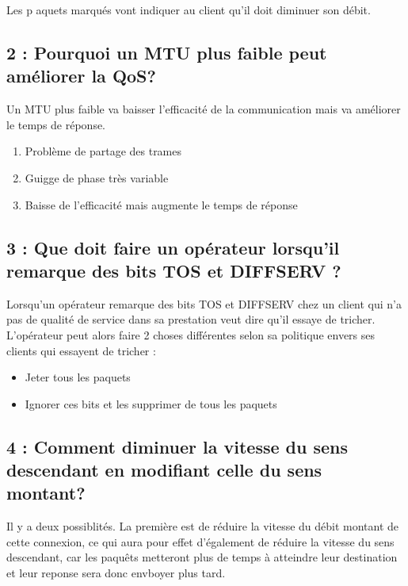\documentclass{article}
\begin{document}
Les p	aquets marqués vont indiquer au client qu'il doit diminuer son débit.

\subsection*{2 : Pourquoi un MTU plus faible peut améliorer la QoS?}

Un MTU plus faible va baisser l'efficacité de la communication mais va améliorer le temps de réponse.
\begin{enumerate}
\item Problème de partage des trames
\item Guigge de phase très variable
\item Baisse de l'efficacité mais augmente le temps de réponse
\end{enumerate}

\subsection*{3 : Que doit faire un opérateur lorsqu'il remarque des bits TOS et DIFFSERV ?}

Lorsqu'un opérateur remarque des bits TOS \cite{ToS} et DIFFSERV \cite{DiffServ} chez un client qui n'a pas de qualité de service dans sa prestation veut dire qu'il essaye de tricher.\\

L'opérateur peut alors faire 2 choses différentes selon sa politique envers ses clients qui essayent de tricher : 

\begin{itemize}
 	\item Jeter tous les paquets
 	\item Ignorer ces bits et les supprimer de tous les paquets
\end{itemize}

\subsection*{4 : Comment diminuer la vitesse du sens descendant en modifiant celle du sens montant?}

Il y a deux possiblités. La première est de réduire la vitesse du débit montant de cette connexion, ce qui aura pour effet d'également de réduire la vitesse du sens descendant, car les paquêts metteront plus de temps à atteindre leur destination et leur reponse sera donc envboyer plus tard.\\
\end{document}
